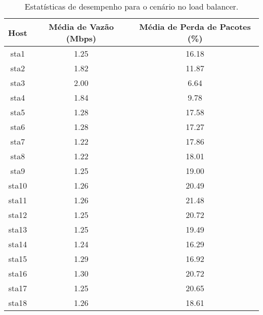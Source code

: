 \begin{table}[htbp]
    \centering
    \label{tab:no_load_balancer_stats}
    \begin{tabular}{|c|c|c|}
        \hline
        \textbf{Host} & \textbf{Média de Vazão (Mbps)} & \textbf{Média de Perda de Pacotes (\%)} \\ \hline
        sta1 & 1.25 & 16.18 \\ \hline
        sta2 & 1.82 & 11.87 \\ \hline
        sta3 & 2.00 & 6.64 \\ \hline
        sta4 & 1.84 & 9.78 \\ \hline
        sta5 & 1.28 & 17.58 \\ \hline
        sta6 & 1.28 & 17.27 \\ \hline
        sta7 & 1.22 & 17.86 \\ \hline
        sta8 & 1.22 & 18.01 \\ \hline
        sta9 & 1.25 & 19.00 \\ \hline
        sta10 & 1.26 & 20.49 \\ \hline
        sta11 & 1.26 & 21.48 \\ \hline
        sta12 & 1.25 & 20.72 \\ \hline
        sta13 & 1.25 & 19.49 \\ \hline
        sta14 & 1.24 & 16.29 \\ \hline
        sta15 & 1.29 & 16.92 \\ \hline
        sta16 & 1.30 & 20.72 \\ \hline
        sta17 & 1.25 & 20.65 \\ \hline
        sta18 & 1.26 & 18.61 \\ \hline
    \end{tabular}
    \caption{Estatísticas de desempenho para o cenário no load balancer.}
\end{table}

